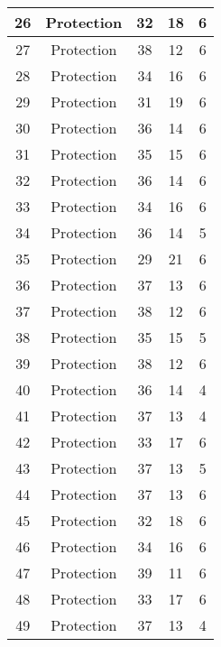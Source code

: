 \documentclass[results.tex]{subfiles}
\begin{document}
\begin{center}
\begin{tabular}{| c || c | c | c | c |}
    \hline
    26 & Protection & 32 & 18 & 6 \\ 
    \hline
    27 & Protection & 38 & 12 & 6 \\ 
    \hline
    28 & Protection & 34 & 16 & 6 \\ 
    \hline
    29 & Protection & 31 & 19 & 6 \\ 
    \hline
    30 & Protection & 36 & 14 & 6 \\ 
    \hline
    31 & Protection & 35 & 15 & 6 \\ 
    \hline
    32 & Protection & 36 & 14 & 6 \\ 
    \hline
    33 & Protection & 34 & 16 & 6 \\ 
    \hline
    34 & Protection & 36 & 14 & 5 \\ 
    \hline
    35 & Protection & 29 & 21 & 6 \\ 
    \hline
    36 & Protection & 37 & 13 & 6 \\ 
    \hline
    37 & Protection & 38 & 12 & 6 \\ 
    \hline
    38 & Protection & 35 & 15 & 5 \\ 
    \hline
    39 & Protection & 38 & 12 & 6 \\ 
    \hline
    40 & Protection & 36 & 14 & 4 \\ 
    \hline
    41 & Protection & 37 & 13 & 4 \\ 
    \hline
    42 & Protection & 33 & 17 & 6 \\ 
    \hline
    43 & Protection & 37 & 13 & 5 \\ 
    \hline
    44 & Protection & 37 & 13 & 6 \\ 
    \hline
    45 & Protection & 32 & 18 & 6 \\ 
    \hline
    46 & Protection & 34 & 16 & 6 \\ 
    \hline
    47 & Protection & 39 & 11 & 6 \\ 
    \hline
    48 & Protection & 33 & 17 & 6 \\ 
    \hline
    49 & Protection & 37 & 13 & 4 \\ 
    \hline   \end{tabular}
\end{center}
\end{document}
